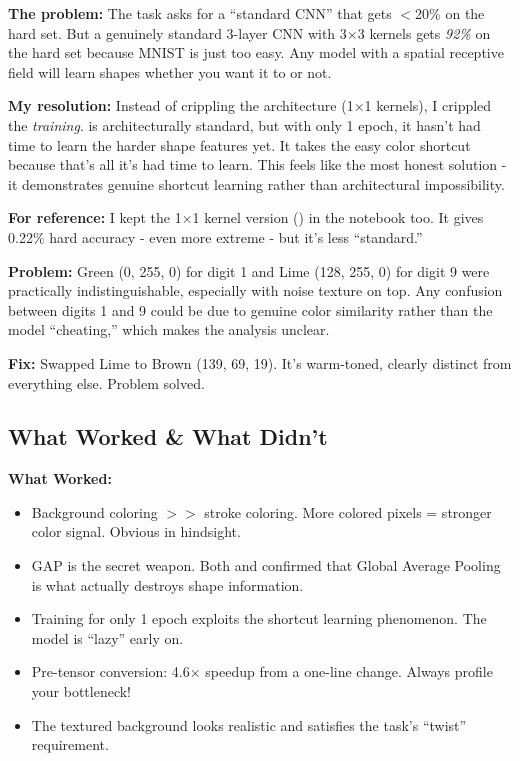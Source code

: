 \documentclass[9pt,a4paper,twocolumn,twoside]{tau-class/tau}
\begin{document}
        \begin{tauenv}[frametitle={Challenge: The ``Standard CNN'' Paradox}]
            \textbf{The problem:} The task asks for a ``standard CNN'' that gets $<$20\% on the hard set. But a genuinely standard 3-layer CNN with 3$\times$3 kernels gets \textit{92\%} on the hard set because MNIST is just too easy. Any model with a spatial receptive field will learn shapes whether you want it to or not.

            \textbf{My resolution:} Instead of crippling the architecture (1$\times$1 kernels), I crippled the \textit{training}.  is architecturally standard, but with only 1 epoch, it hasn't had time to learn the harder shape features yet. It takes the easy color shortcut because that's all it's had time to learn. This feels like the most honest solution - it demonstrates genuine shortcut learning rather than architectural impossibility.

            \textbf{For reference:} I kept the 1$\times$1 kernel version () in the notebook too. It gives 0.22\% hard accuracy - even more extreme - but it's less ``standard.''
        \end{tauenv}

        \begin{tauenv}[frametitle=Issue: Green and Lime Too Similar]
            \textbf{Problem:} Green (0, 255, 0) for digit 1 and Lime (128, 255, 0) for digit 9 were practically indistinguishable, especially with noise texture on top. Any confusion between digits 1 and 9 could be due to genuine color similarity rather than the model ``cheating,'' which makes the analysis unclear.

            \textbf{Fix:} Swapped Lime to Brown (139, 69, 19). It's warm-toned, clearly distinct from everything else. Problem solved.
        \end{tauenv}

    \subsection{What Worked \& What Didn't}

        \textbf{What Worked:}
        \begin{itemize}
            \item Background coloring $>>$ stroke coloring. More colored pixels = stronger color signal. Obvious in hindsight.
            \item GAP is the secret weapon. Both  and  confirmed that Global Average Pooling is what actually destroys shape information.
            \item Training for only 1 epoch exploits the shortcut learning phenomenon. The model is ``lazy'' early on.
            \item Pre-tensor conversion: 4.6$\times$ speedup from a one-line change. Always profile your bottleneck!
            \item The textured background looks realistic and satisfies the task's ``twist'' requirement.
        \end{itemize}
\end{document}
